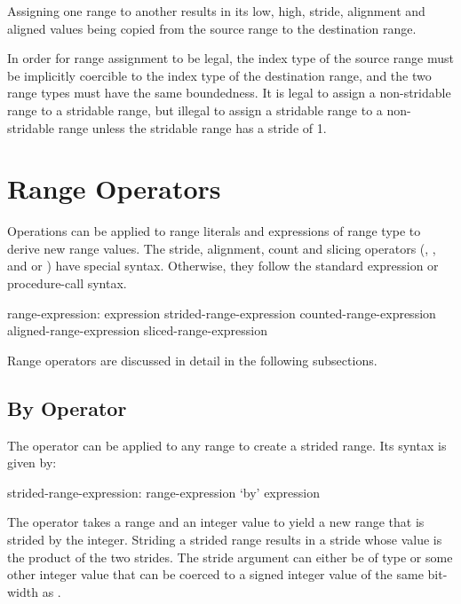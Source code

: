 Assigning one range to another results in its low, high, stride, alignment and
aligned values being copied from the source range to the destination range.

In order for range assignment to be legal, the index type of the
source range must be implicitly coercible to the index type of the
destination range, and the two range types must have the same boundedness.
It is legal to assign a non-stridable range to a stridable
range, but illegal to assign a stridable range to a non-stridable
range unless the stridable range has a stride of 1.


\section{Range Operators}
\label{Range_Operators}

Operations can be applied to range literals and expressions of range type to
derive new range values.  The stride, alignment, count and slicing
operators (, , \chpl{\#} and \chpl{\(\)} or \chpl{\[\]})
have special syntax.  Otherwise, they follow the standard expression or
procedure-call syntax.
\begin{syntax}
range-expression:
  expression
  strided-range-expression
  counted-range-expression
  aligned-range-expression
  sliced-range-expression
\end{syntax}

Range operators are discussed in detail in the following subsections.

\subsection{By Operator}
\label{By_Operator_For_Ranges}

The  operator can be applied to any range to create a strided
range.  Its syntax is given by:
\begin{syntax}
strided-range-expression:
  range-expression `by' expression
\end{syntax}

The  operator takes a range and an integer value to yield a
new range that is strided by the integer.  Striding a strided range
results in a stride whose value is the product of the two strides.
The stride argument can either be of type  or some other
integer value that can be coerced to a signed integer value of the same
bit-width as .  

